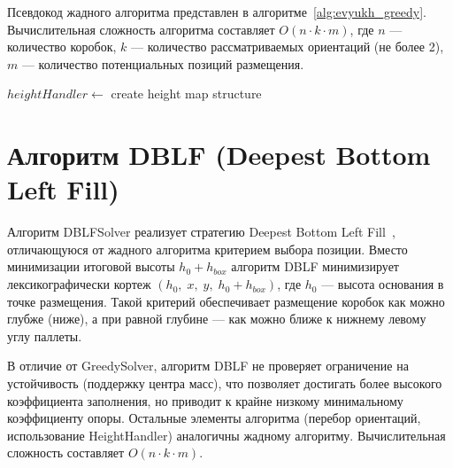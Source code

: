 Псевдокод жадного алгоритма представлен в алгоритме~\ref{alg:evyukh_greedy}. Вычислительная сложность алгоритма составляет $O(n \cdot k \cdot m)$, где $n$ --- количество коробок, $k$ --- количество рассматриваемых ориентаций (не более 2), $m$ --- количество потенциальных позиций размещения.

\begin{algorithm}[H]
\caption{Greedy packing algorithm}
\label{alg:evyukh_greedy}
$heightHandler \leftarrow$ create height map structure\;
\end{algorithm}

\section{Алгоритм DBLF (Deepest Bottom Left Fill)}

Алгоритм DBLFSolver реализует стратегию Deepest Bottom Left Fill~\cite{karabulut}, отличающуюся от жадного алгоритма критерием выбора позиции. Вместо минимизации итоговой высоты $h_0 + h_{box}$ алгоритм DBLF минимизирует лексикографически кортеж $(h_0,\; x,\; y,\; h_0 + h_{box})$, где $h_0$ --- высота основания в точке размещения. Такой критерий обеспечивает размещение коробок как можно глубже (ниже), а при равной глубине --- как можно ближе к нижнему левому углу паллеты.

В отличие от GreedySolver, алгоритм DBLF не проверяет ограничение на устойчивость (поддержку центра масс), что позволяет достигать более высокого коэффициента заполнения, но приводит к крайне низкому минимальному коэффициенту опоры. Остальные элементы алгоритма (перебор ориентаций, использование HeightHandler) аналогичны жадному алгоритму. Вычислительная сложность составляет $O(n \cdot k \cdot m)$.

